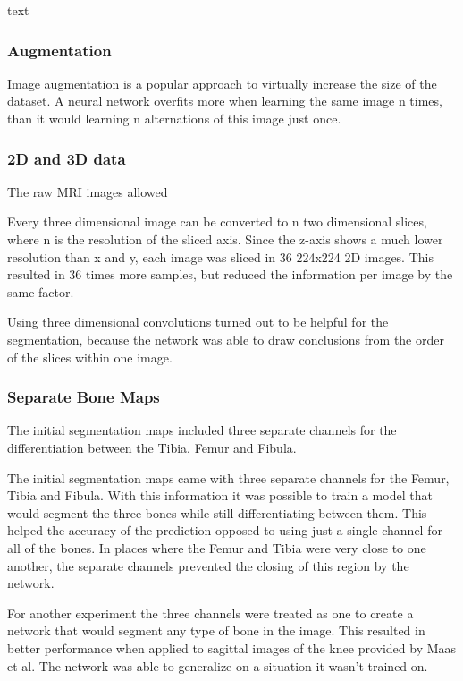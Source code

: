 text

\subsubsection{Augmentation}

Image augmentation is a popular approach to virtually increase the size of the dataset. A neural network overfits more when learning the same image n times, than it would learning n alternations of this image just once.



\subsubsection{2D and 3D data}

The raw MRI images allowed

Every three dimensional image can be converted to n two dimensional slices, where n is the resolution of the sliced axis. Since the z-axis shows a much lower resolution than x and y, each image was sliced in 36 224x224 2D images. This resulted in 36 times more samples, but reduced the information per image by the same factor. 

Using three dimensional convolutions turned out to be helpful for the segmentation, because the network was able to draw conclusions from the order of the slices within one image. 

\subsubsection{Separate Bone Maps}

The initial segmentation maps included three separate channels for the differentiation between the Tibia, Femur and Fibula. 

The initial segmentation maps came with three separate channels for the Femur, Tibia and Fibula. With this information it was possible to train a model that would segment the three bones while still differentiating between them. This helped the accuracy of the prediction opposed to using just a single channel for all of the bones. In places where the Femur and Tibia were very close to one another, the separate channels prevented the closing of this region by the network.

For another experiment the three channels were treated as one to create a network that would segment any type of bone in the image. This resulted in better performance when applied to sagittal images of the knee provided by Maas et al. The network was able to generalize on a situation it wasn't trained on.

